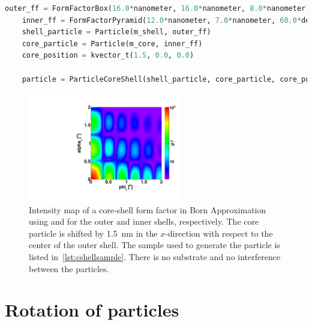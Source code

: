 \newpage

\begin{lstlisting}[language=python,
  style=eclipseboxed,numbers=none,nolol,caption={\Code{Python} script
    to create a core-shell particle made of a box with a pyramidal shifted inset.},label={lst:cshellsample}]
    outer_ff = FormFactorBox(16.0*nanometer, 16.0*nanometer, 8.0*nanometer) 
    inner_ff = FormFactorPyramid(12.0*nanometer, 7.0*nanometer, 60.0*degree)
    shell_particle = Particle(m_shell, outer_ff)
    core_particle = Particle(m_core, inner_ff)
    core_position = kvector_t(1.5, 0.0, 0.0)

    particle = ParticleCoreShell(shell_particle, core_particle, core_position)
\end{lstlisting}

\begin{figure}[ht]
\begin{center}
\includegraphics[angle=-90,width=0.6\textwidth]{fig/gisasmap/CoreShellParallPyr.pdf}
\end{center}
\caption{Intensity map of a core-shell form factor in Born Approximation using   and  for the outer and inner shells, respectively. The core particle is shifted by 1.5~nm in the $x$-direction with respect to the center of the outer shell. The sample used to generate the particle is listed in~\ref{lst:cshellsample}.  There is no substrate and no interference between the particles.}
\label{fig:FFCoreShellBA}
\end{figure}

\section{Rotation of particles}

